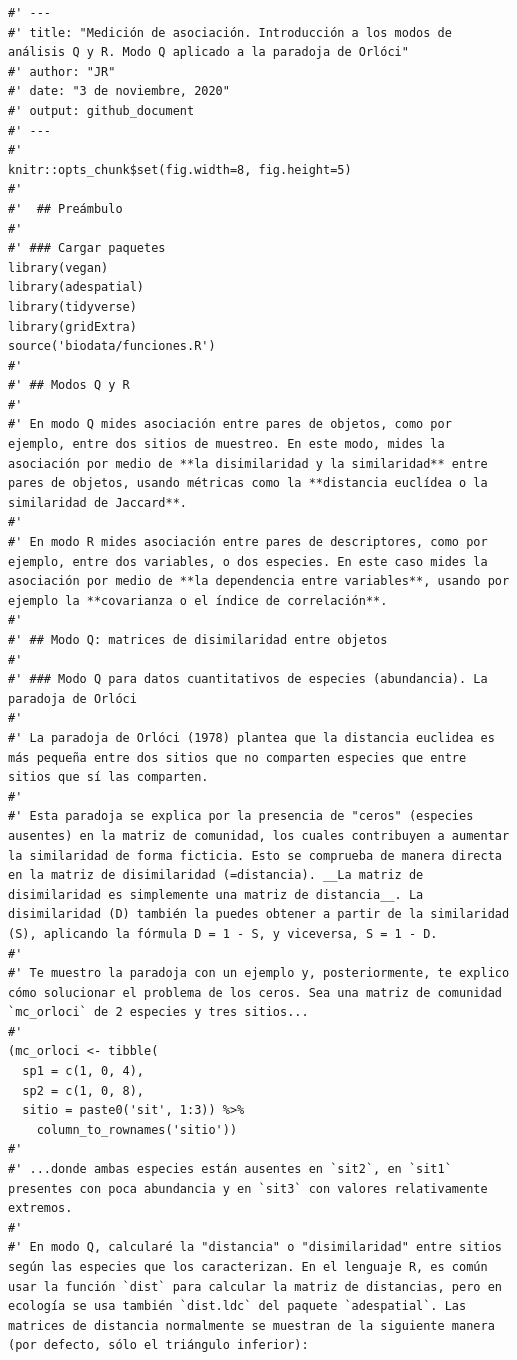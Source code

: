 \documentclass[11pt,]{article}
\begin{document}
\begin{verbatim}
#' ---
#' title: "Medición de asociación. Introducción a los modos de análisis Q y R. Modo Q aplicado a la paradoja de Orlóci"
#' author: "JR"
#' date: "3 de noviembre, 2020"
#' output: github_document
#' ---
#'
knitr::opts_chunk$set(fig.width=8, fig.height=5)
#'
#'  ## Preámbulo
#'  
#' ### Cargar paquetes
library(vegan)
library(adespatial)
library(tidyverse)
library(gridExtra)
source('biodata/funciones.R')
#' 
#' ## Modos Q y R
#' 
#' En modo Q mides asociación entre pares de objetos, como por ejemplo, entre dos sitios de muestreo. En este modo, mides la asociación por medio de **la disimilaridad y la similaridad** entre pares de objetos, usando métricas como la **distancia euclídea o la similaridad de Jaccard**.
#' 
#' En modo R mides asociación entre pares de descriptores, como por ejemplo, entre dos variables, o dos especies. En este caso mides la asociación por medio de **la dependencia entre variables**, usando por ejemplo la **covarianza o el índice de correlación**.
#' 
#' ## Modo Q: matrices de disimilaridad entre objetos
#' 
#' ### Modo Q para datos cuantitativos de especies (abundancia). La paradoja de Orlóci
#' 
#' La paradoja de Orlóci (1978) plantea que la distancia euclidea es más pequeña entre dos sitios que no comparten especies que entre sitios que sí las comparten.
#' 
#' Esta paradoja se explica por la presencia de "ceros" (especies ausentes) en la matriz de comunidad, los cuales contribuyen a aumentar la similaridad de forma ficticia. Esto se comprueba de manera directa en la matriz de disimilaridad (=distancia). __La matriz de disimilaridad es simplemente una matriz de distancia__. La disimilaridad (D) también la puedes obtener a partir de la similaridad (S), aplicando la fórmula D = 1 - S, y viceversa, S = 1 - D.
#'
#' Te muestro la paradoja con un ejemplo y, posteriormente, te explico cómo solucionar el problema de los ceros. Sea una matriz de comunidad `mc_orloci` de 2 especies y tres sitios...
#' 
(mc_orloci <- tibble(
  sp1 = c(1, 0, 4),
  sp2 = c(1, 0, 8),
  sitio = paste0('sit', 1:3)) %>% 
    column_to_rownames('sitio'))
#' 
#' ...donde ambas especies están ausentes en `sit2`, en `sit1` presentes con poca abundancia y en `sit3` con valores relativamente extremos.
#' 
#' En modo Q, calcularé la "distancia" o "disimilaridad" entre sitios según las especies que los caracterizan. En el lenguaje R, es común usar la función `dist` para calcular la matriz de distancias, pero en ecología se usa también `dist.ldc` del paquete `adespatial`. Las matrices de distancia normalmente se muestran de la siguiente manera (por defecto, sólo el triángulo inferior):

\end{verbatim}
\end{document}
